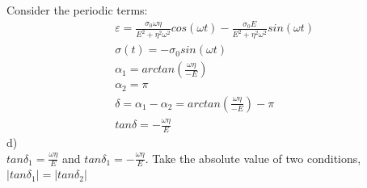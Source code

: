 \documentclass{elsarticle}
\begin{document}
Consider the periodic terms:
\begin{align*}
    &\varepsilon=\frac{\sigma_0\omega\eta}{E^2+\eta^2\omega^2}cos(\omega t)-\frac{\sigma_0 E}{E^2+\eta^2\omega^2}sin(\omega t)\\
    &\sigma (t)=-\sigma_0 sin(\omega t)\\
    &\alpha_1=arctan(\frac{\omega\eta}{-E})\\
    &\alpha_2=\pi\\
    &\delta=\alpha_1-\alpha_2=arctan(\frac{\omega\eta}{-E})-\pi\\
    &tan\delta=-\frac{\omega\eta}{E}
\end{align*}
d)\\
$tan\delta_1=\frac{\omega\eta}{E}$ and $tan\delta_1=-\frac{\omega\eta}{E}$. Take the absolute value of two conditions, $|tan\delta_1|=|tan\delta_2|$
\end{document}
